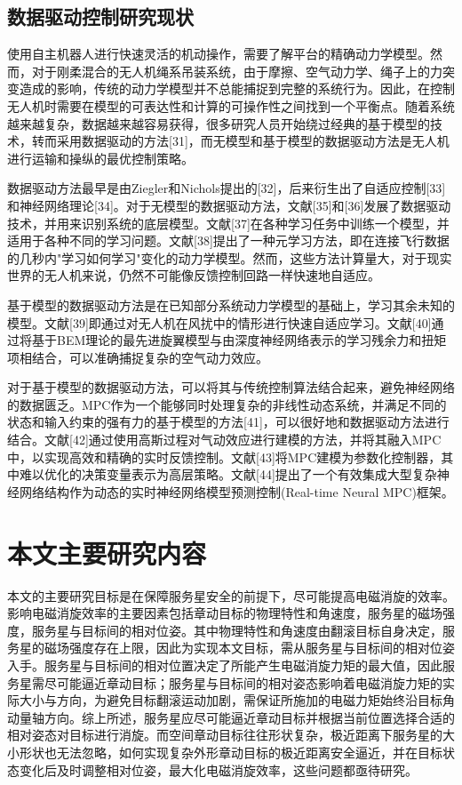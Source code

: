 \documentclass[lang=chs, degree=master, blindreview=false, winfonts=true]{yanputhesis}
\begin{document}
\subsection{数据驱动控制研究现状}
使用自主机器人进行快速灵活的机动操作，需要了解平台的精确动力学模型。然而，对于刚柔混合的无人机绳系吊装系统，由于摩擦、空气动力学、绳子上的力突变造成的影响，传统的动力学模型并不总能捕捉到完整的系统行为。因此，在控制无人机时需要在模型的可表达性和计算的可操作性之间找到一个平衡点。随着系统越来越复杂，数据越来越容易获得，很多研究人员开始绕过经典的基于模型的技术，转而采用数据驱动的方法[31]，而无模型和基于模型的数据驱动方法是无人机进行运输和操纵的最优控制策略。

数据驱动方法最早是由Ziegler和Nichols提出的[32]，后来衍生出了自适应控制[33]和神经网络理论[34]。对于无模型的数据驱动方法，文献[35]和[36]发展了数据驱动技术，并用来识别系统的底层模型。文献[37]在各种学习任务中训练一个模型，并适用于各种不同的学习问题。文献[38]提出了一种元学习方法，即在连接飞行数据的几秒内"学习如何学习"变化的动力学模型。然而，这些方法计算量大，对于现实世界的无人机来说，仍然不可能像反馈控制回路一样快速地自适应。

基于模型的数据驱动方法是在已知部分系统动力学模型的基础上，学习其余未知的模型。文献[39]即通过对无人机在风扰中的情形进行快速自适应学习。文献[40]通过将基于BEM理论的最先进旋翼模型与由深度神经网络表示的学习残余力和扭矩项相结合，可以准确捕捉复杂的空气动力效应。

对于基于模型的数据驱动方法，可以将其与传统控制算法结合起来，避免神经网络的数据匮乏。MPC作为一个能够同时处理复杂的非线性动态系统，并满足不同的状态和输入约束的强有力的基于模型的方法[41]，可以很好地和数据驱动方法进行结合。文献[42]通过使用高斯过程对气动效应进行建模的方法，并将其融入MPC中，以实现高效和精确的实时反馈控制。文献[43]将MPC建模为参数化控制器，其中难以优化的决策变量表示为高层策略。文献[44]提出了一个有效集成大型复杂神经网络结构作为动态的实时神经网络模型预测控制(Real-time Neural MPC)框架。

\section{本文主要研究内容}

本文的主要研究目标是在保障服务星安全的前提下，尽可能提高电磁消旋的效率。影响电磁消旋效率的主要因素包括章动目标的物理特性和角速度，服务星的磁场强度，服务星与目标间的相对位姿。其中物理特性和角速度由翻滚目标自身决定，服务星的磁场强度存在上限，因此为实现本文目标，需从服务星与目标间的相对位姿入手。服务星与目标间的相对位置决定了所能产生电磁消旋力矩的最大值，因此服务星需尽可能逼近章动目标；服务星与目标间的相对姿态影响着电磁消旋力矩的实际大小与方向，为避免目标翻滚运动加剧，需保证所施加的电磁力矩始终沿目标角动量轴方向。综上所述，服务星应尽可能逼近章动目标并根据当前位置选择合适的相对姿态对目标进行消旋。而空间章动目标往往形状复杂，极近距离下服务星的大小形状也无法忽略，如何实现复杂外形章动目标的极近距离安全逼近，并在目标状态变化后及时调整相对位姿，最大化电磁消旋效率，这些问题都亟待研究。
\end{document}
